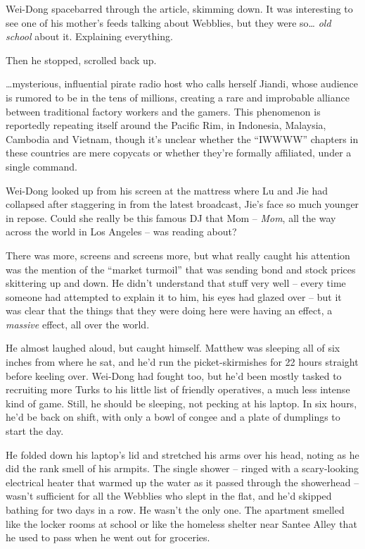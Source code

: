 Wei-Dong spacebarred through the article, skimming down. It was
interesting to see one of his mother's feeds talking about
Webblies, but they were so\ldots{} \emph{old school} about it.
Explaining everything.

Then he stopped, scrolled back up.

\ldots{}mysterious, influential pirate radio host who calls herself
Jiandi, whose audience is rumored to be in the tens of millions,
creating a rare and improbable alliance between traditional factory
workers and the gamers. This phenomenon is reportedly repeating
itself around the Pacific Rim, in Indonesia, Malaysia, Cambodia and
Vietnam, though it's unclear whether the ``IWWWW'' chapters in these
countries are mere copycats or whether they're formally affiliated,
under a single command.

Wei-Dong looked up from his screen at the mattress where Lu and Jie
had collapsed after staggering in from the latest broadcast, Jie's
face so much younger in repose. Could she really be this famous DJ
that Mom -- \emph{Mom}, all the way across the world in Los Angeles
-- was reading about?

There was more, screens and screens more, but what really caught
his attention was the mention of the ``market turmoil'' that was
sending bond and stock prices skittering up and down. He didn't
understand that stuff very well -- every time someone had attempted
to explain it to him, his eyes had glazed over -- but it was clear
that the things that they were doing here were having an effect, a
\emph{massive} effect, all over the world.

He almost laughed aloud, but caught himself. Matthew was sleeping
all of six inches from where he sat, and he'd run the
picket-skirmishes for 22 hours straight before keeling over.
Wei-Dong had fought too, but he'd been mostly tasked to recruiting
more Turks to his little list of friendly operatives, a much less
intense kind of game. Still, he should be sleeping, not pecking at
his laptop. In six hours, he'd be back on shift, with only a bowl
of congee and a plate of dumplings to start the day.

He folded down his laptop's lid and stretched his arms over his
head, noting as he did the rank smell of his armpits. The single
shower -- ringed with a scary-looking electrical heater that warmed
up the water as it passed through the showerhead -- wasn't
sufficient for all the Webblies who slept in the flat, and he'd
skipped bathing for two days in a row. He wasn't the only one. The
apartment smelled like the locker rooms at school or like the
homeless shelter near Santee Alley that he used to pass when he
went out for groceries.

